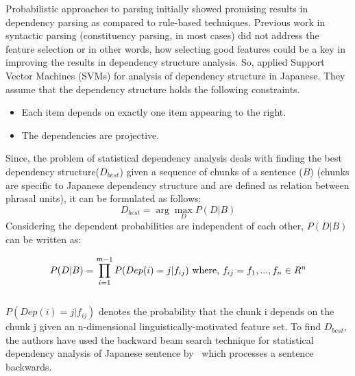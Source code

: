 Probabilistic approaches to parsing initially showed promising results in dependency parsing as compared to rule-based techniques. 
Previous work in syntactic parsing (constituency parsing, in most cases) did not address the feature selection or in other words, how selecting good features could be a key in improving the results in dependency structure analysis.
So, \cite{Kudo:2000:JDS:1117794.1117797} applied Support Vector Machines (SVMs) for analysis of dependency structure in Japanese. They assume that the dependency structure holds the following constraints.
\begin{itemize}
    \item Each item depends on exactly one item appearing to the right.
    \item The dependencies are projective.
\end{itemize}
Since, the problem of statistical dependency analysis deals with finding the best dependency structure($D_{best}$) given a sequence of chunks of a sentence ($B$) (chunks are specific to Japanese dependency structure and are defined as relation between phrasal units), it can be formulated as follows:
\begin{equation*}
    D_{best} = \arg\max_{D} P(D|B)
\end{equation*}
Considering the dependent probabilities are independent of each other, $P(D|B)$ can be written as:

\begin{equation}
P(D|B) = \prod_{i=1}^{m-1}P(Dep(i)=j|f_{ij}) 
\\
\text{ where, } 
\\
f_{ij} = {f_1,...,f_n} \in R^n 
\end{equation} \\
$P(Dep(i)=j|f_{ij})$ denotes the probability that the chunk i depends on the chunk j given an n-dimensional linguistically-motivated feature set. 
To find $D_{best}$, the authors have used the backward beam search technique for statistical dependency analysis of Japanese sentence by~\cite{Sekine:2000:BBS:992730.992755} which processes a sentence backwards.

